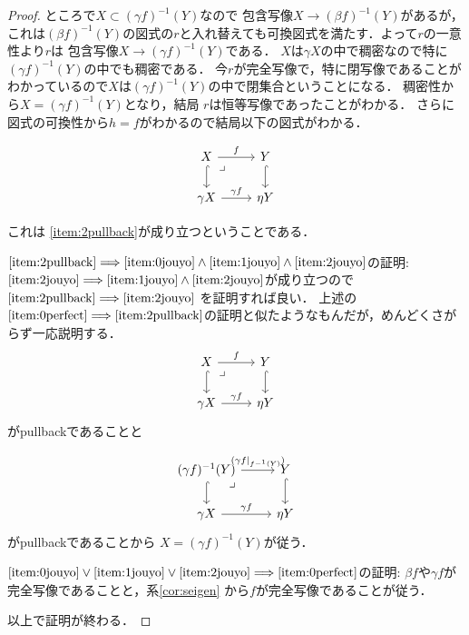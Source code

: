 \documentclass[leqno, a4paper, 12pt, dvipdfmx]{jsarticle}
\newcommand{\To}{\Longrightarrow}
\begin{document}
\begin{proof}
ところで$X\subset (\gamma f)^{-1}(Y)$なので
包含写像$X\to (\beta f)^{-1}(Y)$があるが，
これは$(\beta f)^{-1}(Y)$の図式の$r$と入れ替えても可換図式を満たす．よって$r$の一意性より$r$は
包含写像$X\to (\gamma f)^{-1}(Y)$である．
$X$は$\gamma X$の中で稠密なので特に
$(\gamma f)^{-1}(Y)$の中でも稠密である．
今$r$が完全写像で，特に閉写像であることがわかっているので$X$は$(\gamma f)^{-1}(Y)$の中で閉集合ということになる．
稠密性から$X=(\gamma f)^{-1}(Y)$となり，結局
$r$は恒等写像であったことがわかる．
さらに図式の可換性から$h=f$がわかるので結局以下の図式がわかる．


\[
\begin{tikzcd}
X  \arrow[dr, phantom, "\lrcorner", very near start]\arrow[r,"f"] \arrow[d, hook, ""] & Y \arrow[d, hook, ""] \\
\gamma X\arrow[r,"\gamma f"] &  \eta Y
\end{tikzcd}
\]


これは
\ref{item:2pullback}が成り立つということである．

$\ref{item:2pullback}\To \ref{item:0jouyo}\land \ref{item:1jouyo}\land \ref{item:2jouyo}$の証明:
$\ref{item:2jouyo}\To \ref{item:1jouyo}\land \ref{item:2jouyo}$が成り立つので
$\ref{item:2pullback}\To \ref{item:2jouyo}$
を証明すれば良い．
上述の
$\ref{item:0perfect}\To \ref{item:2pullback}$の証明と似たようなもんだが，めんどくさがらず一応説明する．
\[
\begin{tikzcd}
X  \arrow[dr, phantom, "\lrcorner", very near start]\arrow[r,"f"] \arrow[d, hook, ""] & Y \arrow[d, hook, ""] \\
\gamma X\arrow[r,"\gamma f"] &  \eta Y
\end{tikzcd}
\]
がpullbackであることと

\[
\begin{tikzcd}
(\gamma f)^{-1}(Y)  \arrow[dr, phantom, "\lrcorner", very near start]\arrow[r,"(\gamma f|_{f-^{1}(Y)})"] \arrow[d, hook, ""] & Y \arrow[d, hook, ""] \\
\gamma X\arrow[r,"\gamma f"] &  \eta Y
\end{tikzcd}
\]
がpullbackであることから
$X=(\gamma f)^{-1}(Y)$が従う．


$\ref{item:0jouyo}\lor \ref{item:1jouyo}\lor \ref{item:2jouyo}\To \ref{item:0perfect}$の証明:
$\beta f$や$\gamma f$が完全写像であることと，系\ref{cor:seigen}
から$f$が完全写像であることが従う．




以上で証明が終わる．
\end{proof}
\end{document}
